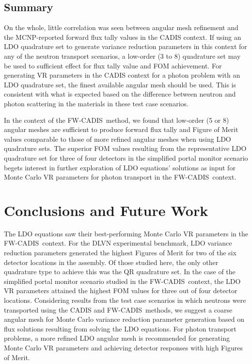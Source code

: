 \documentclass{article} %
\newcommand{\fwc}{\mbox{FW-CADIS}}
\begin{document}
\subsection{Summary}

On the whole, little correlation was seen between angular mesh refinement and
the MCNP-reported forward flux tally values in the CADIS context. If using an
LDO quadrature set to generate variance reduction parameters in this context
for any of the neutron transport scenarios, a low-order (3 to 8) quadrature set
may be used to sufficient effect for flux tally value and FOM achievement. For
generating VR parameters in the CADIS context for a photon problem with an LDO
quadrature set, the finest available angular mesh should be used. This is
consistent with what is expected based on the difference between neutron and
photon scattering in the materials in these test case scenarios.

In the context of the \fwc\ method, we found that low-order (5 or 8) angular
meshes are sufficient to produce forward flux tally and Figure of Merit values
comparable to those of more refined angular meshes when using LDO quadrature
sets. The superior FOM values resulting from the representative LDO quadrature
set for three of four detectors in the simplified portal monitor scenario
begets interest in further exploration of LDO equations' solutions as input
for Monte Carlo VR parameters for photon transport in the \fwc\ context.

\section{Conclusions and Future Work}
\label{sec:conclusions}

The LDO equations saw their best-performing Monte Carlo VR parameters in
the \fwc\ context. For the DLVN experimental benchmark, LDO variance reduction
parameters generated the highest Figures of Merit for two of the six detector
locations in the assembly. Of those studied here, the only other quadrature
type to achieve this was the QR quadrature set. In the case of the simplified
portal monitor scenario studied in the \fwc\ context, the LDO VR
parameters attained the highest FOM values for three out of four detector
locations. Considering results from the test case scenarios in which neutrons
were transported using the CADIS and \fwc\ methods, we suggest a coarse
angular mesh for Monte Carlo variance reduction parameter generation based on
flux solutions resulting from solving the LDO equations. For photon transport
problems, a more refined LDO angular mesh is recommended for generating Monte
Carlo VR parameters and achieving detector responses with high Figures of
Merit.
\end{document}
